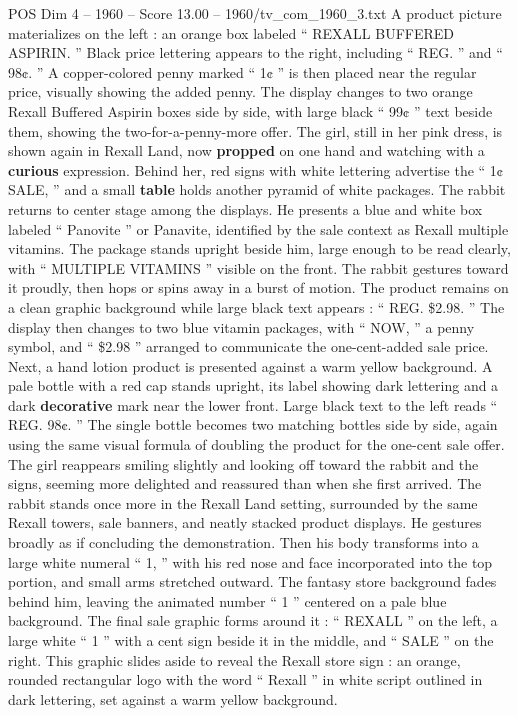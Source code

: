 \begin{textsample}{POS Dim 4 – 1960 – Score 13.00 – 1960/tv\_com\_1960\_3.txt}
A product picture materializes on the left : an orange box labeled “ REXALL BUFFERED ASPIRIN. ” Black price lettering appears to the right, including “ REG. ” and “ 98¢. ” A copper-colored penny marked “ 1¢ ” is then placed near the regular price, visually showing the added penny.
The display changes to two orange Rexall Buffered Aspirin boxes side by side, with large black “ 99¢ ” text beside them, showing the two-for-a-penny-more offer.
The girl, still in her pink dress, is shown again in Rexall Land, now \textbf{propped} on one hand and watching with a \textbf{curious} expression.
Behind her, red signs with white lettering advertise the “ 1¢ SALE, ” and a small \textbf{table} holds another pyramid of white packages.
The rabbit returns to center stage among the displays.
He presents a blue and white box labeled “ Panovite ” or Panavite, identified by the sale context as Rexall multiple vitamins.
The package stands upright beside him, large enough to be read clearly, with “ MULTIPLE VITAMINS ” visible on the front.
The rabbit gestures toward it proudly, then hops or spins away in a burst of motion.
The product remains on a clean graphic background while large black text appears : “ REG. \$2.98. ” The display then changes to two blue vitamin packages, with “ NOW, ” a penny symbol, and “ \$2.98 ” arranged to communicate the one-cent-added sale price.
Next, a hand lotion product is presented against a warm yellow background.
A pale bottle with a red cap stands upright, its label showing dark lettering and a dark \textbf{decorative} mark near the lower front.
Large black text to the left reads “ REG. 98¢. ” The single bottle becomes two matching bottles side by side, again using the same visual formula of doubling the product for the one-cent sale offer.
The girl reappears smiling slightly and looking off toward the rabbit and the signs, seeming more delighted and reassured than when she first arrived.
The rabbit stands once more in the Rexall Land setting, surrounded by the same Rexall towers, sale banners, and neatly stacked product displays.
He gestures broadly as if concluding the demonstration.
Then his body transforms into a large white numeral “ 1, ” with his red nose and face incorporated into the top portion, and small arms stretched outward.
The fantasy store background fades behind him, leaving the animated number “ 1 ” centered on a pale blue background.
The final sale graphic forms around it : “ REXALL ” on the left, a large white “ 1 ” with a cent sign beside it in the middle, and “ SALE ” on the right.
This graphic slides aside to reveal the Rexall store sign : an orange, rounded rectangular logo with the word “ Rexall ” in white script outlined in dark lettering, set against a warm yellow background.

\end{textsample}
